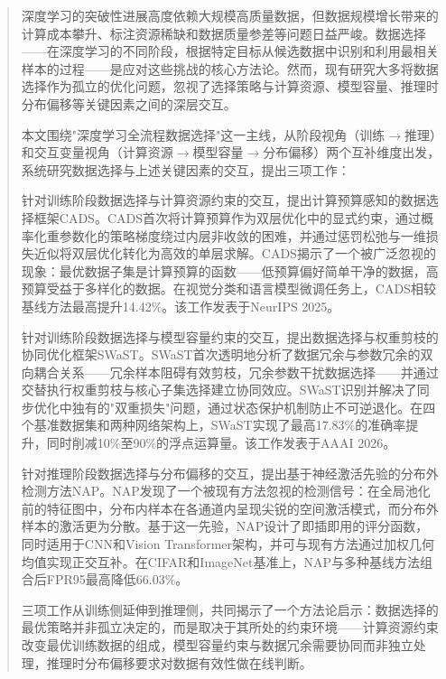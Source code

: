 \documentclass[type=doctor]{fduthesis}
\begin{document}
\frontmatter

\tableofcontents

\begin{abstract}
深度学习的突破性进展高度依赖大规模高质量数据，但数据规模增长带来的计算成本攀升、标注资源稀缺和数据质量参差等问题日益严峻。数据选择——在深度学习的不同阶段，根据特定目标从候选数据中识别和利用最相关样本的过程——是应对这些挑战的核心方法论。然而，现有研究大多将数据选择作为孤立的优化问题，忽视了选择策略与计算资源、模型容量、推理时分布偏移等关键因素之间的深层交互。

本文围绕"深度学习全流程数据选择"这一主线，从阶段视角（训练$\to$推理）和交互变量视角（计算资源$\to$模型容量$\to$分布偏移）两个互补维度出发，系统研究数据选择与上述关键因素的交互，提出三项工作：

针对训练阶段数据选择与计算资源约束的交互，提出计算预算感知的数据选择框架CADS。CADS首次将计算预算作为双层优化中的显式约束，通过概率化重参数化的策略梯度绕过内层非收敛的困难，并通过惩罚松弛与一维损失近似将双层优化转化为高效的单层求解。CADS揭示了一个被广泛忽视的现象：最优数据子集是计算预算的函数——低预算偏好简单干净的数据，高预算受益于多样化的数据。在视觉分类和语言模型微调任务上，CADS相较基线方法最高提升14.42\%。该工作发表于NeurIPS 2025。%

针对训练阶段数据选择与模型容量约束的交互，提出数据选择与权重剪枝的协同优化框架SWaST。SWaST首次透明地分析了数据冗余与参数冗余的双向耦合关系——冗余样本阻碍有效剪枝，冗余参数干扰数据选择——并通过交替执行权重剪枝与核心子集选择建立协同效应。SWaST识别并解决了同步优化中独有的"双重损失"问题，通过状态保护机制防止不可逆退化。在四个基准数据集和两种网络架构上，SWaST实现了最高17.83\%的准确率提升，同时削减10\%至90\%的浮点运算量。该工作发表于AAAI 2026。%

针对推理阶段数据选择与分布偏移的交互，提出基于神经激活先验的分布外检测方法NAP。NAP发现了一个被现有方法忽视的检测信号：在全局池化前的特征图中，分布内样本在各通道内呈现尖锐的空间激活模式，而分布外样本的激活更为分散。基于这一先验，NAP设计了即插即用的评分函数，同时适用于CNN和Vision Transformer架构，并可与现有方法通过加权几何均值实现正交互补。在CIFAR和ImageNet基准上，NAP与多种基线方法组合后FPR95最高降低66.03\%。%

三项工作从训练侧延伸到推理侧，共同揭示了一个方法论启示：数据选择的最优策略并非孤立决定的，而是取决于其所处的约束环境——计算资源约束改变最优训练数据的组成，模型容量约束与数据冗余需要协同而非独立处理，推理时分布偏移要求对数据有效性做在线判断。
\end{abstract}
\end{document}
